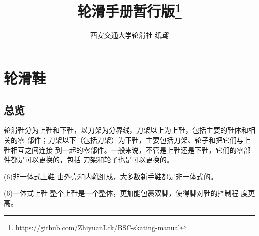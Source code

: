 \documentclass[12pt]{ctexart}
\title{轮滑手册暂行版\footnote{\url{https://github.com/ZhiyuanLck/BSC-skating-manual}}}
\author{西安交通大学轮滑社-纸鸢}
\begin{document}
\thispagestyle{empty}
\maketitle
\clearpage
\tableofcontents
\clearpage
\section{轮滑鞋}
\subsection{总览}
轮滑鞋分为上鞋和下鞋，以刀架为分界线，刀架以上为上鞋，包括主要的鞋体和相关的零
部件；刀架以下（包括刀架）为下鞋，主要包括刀架、轮子和把它们与上鞋相互之间连接
到一起的零部件。一般来说，不管是上鞋还是下鞋，它们的零部件都是可以更换的，包括
刀架和轮子也是可以更换的。

\bsctype(6){非一体式上鞋} 由外壳和内靴组成，大多数新手鞋都是非一体式的。

\bsctype(6){一体式上鞋} 整个上鞋是一个整体，更加能包裹双脚，使得脚对鞋的控制程
度更高。
\end{document}
